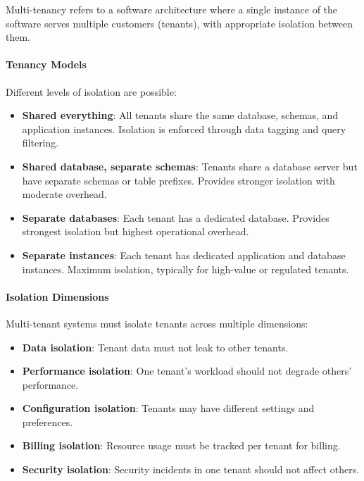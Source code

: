\documentclass[a4paper,twoside]{sapthesis}
\begin{document}
Multi-tenancy refers to a software architecture where a single instance of the software serves multiple customers (tenants), with appropriate isolation between them.

\paragraph{Tenancy Models}

Different levels of isolation are possible:

\begin{itemize}
    \item \textbf{Shared everything}: All tenants share the same database, schemas, and application instances. Isolation is enforced through data tagging and query filtering.
    
    \item \textbf{Shared database, separate schemas}: Tenants share a database server but have separate schemas or table prefixes. Provides stronger isolation with moderate overhead.
    
    \item \textbf{Separate databases}: Each tenant has a dedicated database. Provides strongest isolation but highest operational overhead.
    
    \item \textbf{Separate instances}: Each tenant has dedicated application and database instances. Maximum isolation, typically for high-value or regulated tenants.
\end{itemize}

\paragraph{Isolation Dimensions}

Multi-tenant systems must isolate tenants across multiple dimensions:

\begin{itemize}
    \item \textbf{Data isolation}: Tenant data must not leak to other tenants.
    \item \textbf{Performance isolation}: One tenant's workload should not degrade others' performance.
    \item \textbf{Configuration isolation}: Tenants may have different settings and preferences.
    \item \textbf{Billing isolation}: Resource usage must be tracked per tenant for billing.
    \item \textbf{Security isolation}: Security incidents in one tenant should not affect others.
\end{itemize}
\end{document}
